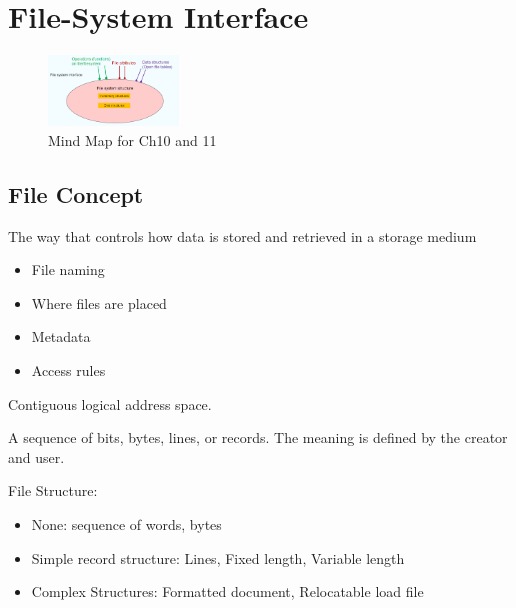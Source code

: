 \newpage
\section{File-System Interface}

\begin{figure}[!htb]
    \centering
    \includegraphics[width=0.309\textwidth]{pic/OS10/Mind Map for Ch10 and 11}
    \caption{Mind Map for Ch10 and 11}
\end{figure}

\subsection{File Concept}
\begin{definition}
    The way that controls how data is stored and retrieved in a storage medium
    \begin{itemize}
        \item File naming
        \item Where files are placed
        \item Metadata
        \item Access rules
    \end{itemize}
\end{definition}

\begin{definition}[File]
    Contiguous logical address space. 
    
    A sequence of bits, bytes, lines, or records. The meaning is defined by the creator and user.
\end{definition}

File Structure:
\begin{itemize}\scriptsize
    \item None: sequence of words, bytes
    \item Simple record structure: Lines, Fixed length, Variable length
    \item Complex Structures: Formatted document, Relocatable load file
\end{itemize}

